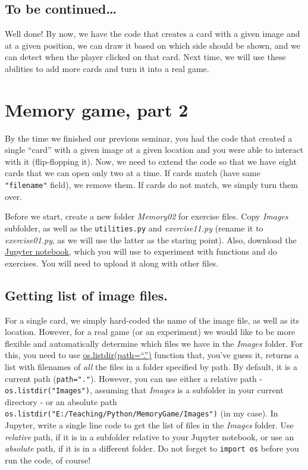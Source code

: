 \documentclass[
]{book}
\begin{document}
\hypertarget{to-be-continued}{%
\section{To be continued\ldots{}}\label{to-be-continued}}

Well done! By now, we have the code that creates a card with a given image and at a given position, we can draw it based on which side should be shown, and we can detect when the player clicked on that card. Next time, we will use these abilities to add more cards and turn it into a real game.

\hypertarget{seminar10}{%
\chapter{Memory game, part 2}\label{seminar10}}

By the time we finished our previous seminar, you had the code that created a single ``card'' with a given image at a given location and you were able to interact with it (flip-flopping it). Now, we need to extend the code so that we have eight cards that we can open only two at a time. If cards match (have same \texttt{"filename"} field), we remove them. If cards do not match, we simply turn them over.

Before we start, create a new folder \emph{Memory02} for exercise files. Copy \emph{Images} subfolder, as well as the \texttt{utilities.py} and \emph{exercise11.py} (rename it to \emph{exercise01.py}, as we will use the latter as the staring point). Also, download the \href{notebooks/Seminar\%2010.\%20Memory\%20game,\%20part\%202.ipynb}{Jupyter notebook}, which you will use to experiment with functions and do exercises. You will need to upload it along with other files.

\hypertarget{getting-list-of-image-files.}{%
\section{Getting list of image files.}\label{getting-list-of-image-files.}}

For a single card, we simply hard-coded the name of the image file, as well as its location. However, for a real game (or an experiment) we would like to be more flexible and automatically determine which files we have in the \emph{Images} folder. For this, you need to use \href{https://docs.python.org/3/library/os.html\#os.listdir}{os.listdir(path=``.'')} function that, you've guess it, returns a list with filenames of \emph{all} the files in a folder specified by path. By default, it is a current path (\texttt{path="."}). However, you can use either a relative path - \texttt{os.listdir("Images")}, assuming that \emph{Images} is a subfolder in your current directory - or an absolute path \texttt{os.listdir("E:/Teaching/Python/MemoryGame/Images")} (in my case). In Jupyter, write a single line code to get the list of files in the \emph{Images} folder. Use \emph{relative} path, if it is in a subfolder relative to your Jupyter notebook, or use an \emph{absolute} path, if it is in a different folder. Do not forget to \texttt{import\ os} before you run the code, of course!
\end{document}
